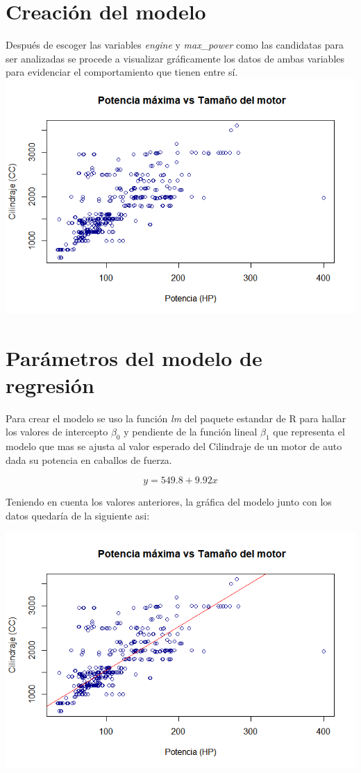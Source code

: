 \documentclass{article}
\begin{document}
\section{Creación del modelo}
Después de escoger las variables \textit{engine} y \textit{max\_power} como las candidatas para ser analizadas se procede a visualizar gráficamente los datos de ambas variables para evidenciar el comportamiento que tienen entre sí.
\includegraphics[scale=0.45, trim={0cm 0cm 0cm 0cm}, clip]{graphs/conclusion2.png}

\section{Parámetros del modelo de regresión}
Para crear el modelo se uso la función \textit{lm} del paquete estandar de R para hallar los valores de intercepto \(\beta_0\) y pendiente de la función lineal \(\beta_1\) que representa el modelo que mas se ajusta al valor esperado del Cilindraje de un motor de auto dada su potencia en caballos de fuerza.

\[y = 549.8 + 9.92x\]

Teniendo en cuenta los valores anteriores, la gráfica del modelo junto con los datos quedaría de la siguiente asi:

\includegraphics[scale=0.45, trim={0cm 0cm 0cm 0cm}, clip]{graphs/conclusion3.png}
\end{document}
